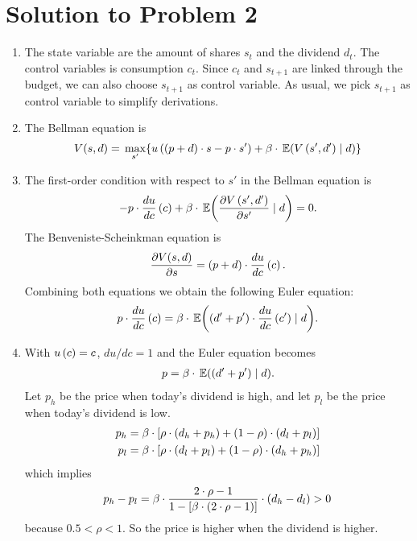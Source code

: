 \documentclass[letterpaper,12pt,leqno]{article}
\begin{document}
\section*{Solution to Problem 2}

\begin{enumerate}
\item The state variable are the amount of shares $s_{t}$ and the dividend $d_{t}$.  The
control variables is consumption $c_{t}$. Since $c_{t}$ and $s_{t+1}$ are linked through the budget, we can also choose $s_{t+1}$ as control variable. As usual, we pick $s_{t+1}$ as control variable to simplify derivations.
\item The Bellman equation is 
\begin{align*}
V(s,d) = \max[s']{u\bp{\bp{p+d}\cdot s-p\cdot s'} +\b \cdot\E{V\bp{s',d'} \mid d}}
\end{align*}
\item The first-order condition with respect to $s'$ in the Bellman equation is
\begin{align*}
-p\cdot \od{u}{c}\bp{c} +\b \cdot \E{\pd{V\bp{s',d'}}{s'} \mid d} =0.
\end{align*}
The Benveniste-Scheinkman equation is
\begin{align*}
\frac{\partial V(s,d)}{\partial s} =\left( p+d \right) \cdot \frac{d u}{d c}\left( c \right).
\end{align*}
Combining both equations we obtain the following Euler equation:
\begin{align*}
p\cdot \od{u}{c}\bp{c} =\b \cdot \E{\bp{d'+p'}\cdot  \od{u}{c}\bp{c'} \mid d} .
\end{align*}

\item With $u\left( c \right) =c$, $du/dc=1$ and the Euler equation becomes 
\begin{align*}
p=\b \cdot \E{\bp{d'+p'} \mid d} .
\end{align*}
Let $p_{h}$ be the price when today's dividend is high, and let $p_{l}$ be the price when today's dividend is low.
\begin{align*}
p_{h} &=\beta \cdot \left[ \rho\cdot  \left( d_{h}+p_{h} \right) +\left( 1-\rho \right)\cdot \left( d_{l}+p_{l} \right) \right] \\
p_{l} &=\beta \cdot \left[ \rho \cdot \left( d_{l}+p_{l} \right) +\left( 1-\rho \right)\cdot \left( d_{h}+p_{h} \right) \right]
\end{align*}
which implies
\begin{align*}
p_{h}-p_{l}=\beta\cdot \frac{2\cdot \rho -1 }{1-\left[ \beta \cdot \left( 2\cdot \rho -1 \right) \right]}\cdot \left( d_{h}-d_{l} \right)>0
\end{align*}
because $0.5<\rho<1$. So the price is higher when the dividend is higher.
\end{enumerate}
\end{document}
